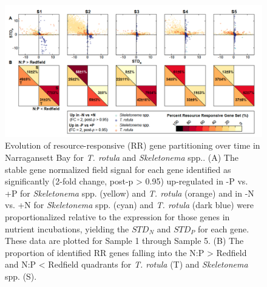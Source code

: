 \begin{figure}[p!]
  \centering
    \includegraphics[width=1\textwidth]{Images/C3_Figure5_Quadrants.png}
    \caption[Evolution of resource-responsive (RR) gene partitioning over time in Narragansett Bay]{Evolution of resource-responsive (RR) gene partitioning over time in Narragansett Bay for \textit{T. rotula} and \textit{Skeletonema} spp.. (A) The stable gene normalized field signal for each gene identified as significantly (2-fold change, post-p > 0.95) up-regulated in -P vs. +P for \textit{Skeletonema} spp. (yellow) and \textit{T. rotula} (orange) and in -N vs. +N for \textit{Skeletonema} spp. (cyan) and \textit{T. rotula} (dark blue) were proportionalized relative to the expression for those genes in nutrient incubations, yielding the $STD_N$ and $STD_P$ for each gene. These data are plotted for Sample 1 through Sample 5. (B) The proportion of identified RR genes falling into the N:P > Redfield and N:P < Redfield quadrants for \textit{T. rotula} (T) and \textit{Skeletonema} spp. (S).}

  \label{fig:c3f5}
\end{figure}

